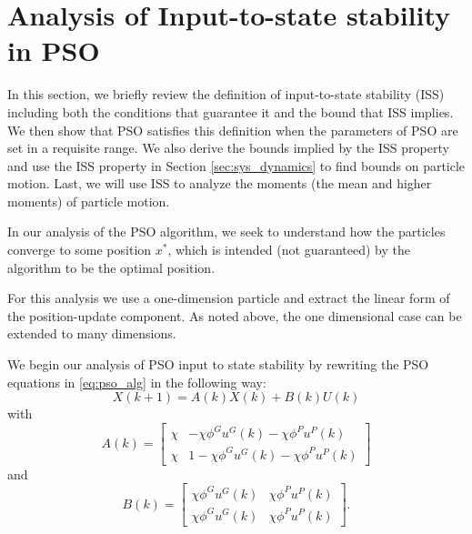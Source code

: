 \documentclass{sig-alternate}
\begin{document}
\section{Analysis of Input-to-state stability in PSO}
\label{sec:iss}

In this section, we briefly review the definition of input-to-state stability (ISS) including both the conditions that guarantee it and the bound that ISS implies\cite{Jiang2001857}. 
We then show that PSO satisfies this definition when the parameters of PSO are
set in a requisite range. 
We also derive the bounds implied by the ISS property and
use the ISS property in Section \ref{sec:sys_dynamics} to find bounds on particle motion.
Last, we will use ISS to analyze the moments (the mean and higher moments) of particle motion.

In our analysis of the PSO algorithm, we seek to understand how the particles converge to some position $ x^{*} $, which is intended (not guaranteed) by the algorithm to be the optimal position.

For this analysis we use a one-dimension particle and extract the linear form of the position-update component. As noted above, the one dimensional case can be extended to many dimensions.

We begin our analysis of PSO input to state stability by rewriting the PSO equations in \eqref{eq:pso_alg} in the following way:
\begin{equation}
\label{eq:pso_up_linalg_simp}
X(k+1) = A(k) X(k) + B(k) U(k)
\end{equation}
with
\begin{equation}
\nonumber
A(k) = \begin{bmatrix}
\chi & - \chi \phi^{G} u^{G}(k) - \chi \phi^{P} u^{P}(k)
\\ 
\chi & 1 - \chi \phi^{G} u^{G}(k) - \chi \phi^{P} u^{P}(k)
\end{bmatrix} 
\end{equation}
and
\begin{equation}
\nonumber
B(k) = \begin{bmatrix}
\chi \phi^{G} u^{G}(k) & \chi \phi^{P} u^{P}(k)
\\ 
\chi \phi^{G} u^{G}(k) & \chi \phi^{P} u^{P}(k)
\end{bmatrix}.
\end{equation}
\end{document}

